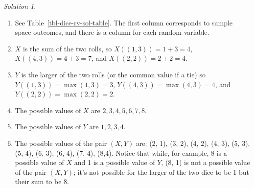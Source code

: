 \documentclass[
  letterpaper,
  DIV=11,
  numbers=noendperiod]{scrreprt}
\providecommand{\tightlist}{%
  \setlength{\itemsep}{0pt}\setlength{\parskip}{0pt}}
\theoremstyle{plain}
\theoremstyle{definition}
\theoremstyle{definition}
\theoremstyle{definition}
\theoremstyle{remark}
\newtheorem{refsolution}{Solution}[chapter]
\begin{document}
\begin{tcolorbox}[enhanced jigsaw, opacityback=0, rightrule=.15mm, coltitle=black, colframe=quarto-callout-tip-color-frame, toprule=.15mm, colbacktitle=quarto-callout-tip-color!10!white, opacitybacktitle=0.6, left=2mm, toptitle=1mm, breakable, title={Solution (click to expand)}, bottomtitle=1mm, colback=white, leftrule=.75mm, titlerule=0mm, arc=.35mm, bottomrule=.15mm]

\begin{refsolution}
\leavevmode

\begin{enumerate}
\def\labelenumi{\arabic{enumi}.}
\tightlist
\item
  See Table~\ref{tbl-dice-rv-sol-table}. The first column corresponds to
  sample space outcomes, and there is a column for each random variable.
\item
  \(X\) is the sum of the two rolls, so \(X((1, 3))=1+3=4\),
  \(X((4, 3))=4+3=7\), and \(X((2, 2))=2+2=4\).
\item
  \(Y\) is the larger of the two rolls (or the common value if a tie) so
  \(Y((1, 3))=\max(1, 3) = 3\), \(Y((4, 3))=\max(4, 3) =4\), and
  \(Y((2, 2))=\max(2, 2) = 2\).
\item
  The possible values of \(X\) are \(2, 3, 4, 5, 6, 7, 8\).
\item
  The possible values of \(Y\) are \(1, 2, 3, 4\).
\item
  The possible values of the pair \((X, Y)\) are: (2, 1), (3, 2), (4,
  2), (4, 3), (5, 3), (5, 4), (6, 3), (6, 4), (7, 4), (8,4). Notice that
  while, for example, 8 is a possible value of \(X\) and 1 is a possible
  value of \(Y\), (8, 1) is not a possible value of the pair \((X, Y)\);
  it's not possible for the larger of the two dice to be 1 but their sum
  to be 8.
\end{enumerate}

\label{sol-dice-rv}

\end{refsolution}

\end{tcolorbox}
\end{document}
